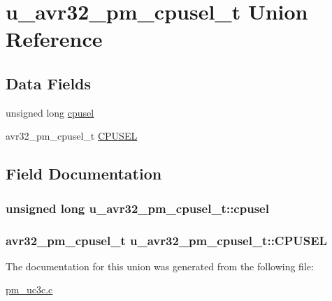 \hypertarget{unionu__avr32__pm__cpusel__t}{
\section{u\-\_\-avr32\-\_\-pm\-\_\-cpusel\-\_\-t \-Union \-Reference}
\label{unionu__avr32__pm__cpusel__t}
}
\subsection*{\-Data \-Fields}
\begin{DoxyCompactItemize}
\item 
unsigned long \hyperlink{unionu__avr32__pm__cpusel__t_ad91bec8f2c8bcc786fcbb710d5354154}{cpusel}
\item 
avr32\-\_\-pm\-\_\-cpusel\-\_\-t \hyperlink{unionu__avr32__pm__cpusel__t_a975b36252484e92630b1e999b83062bb}{\-C\-P\-U\-S\-E\-L}
\end{DoxyCompactItemize}


\subsection{\-Field \-Documentation}
\hypertarget{unionu__avr32__pm__cpusel__t_ad91bec8f2c8bcc786fcbb710d5354154}{
\subsubsection[{cpusel}]{\setlength{\rightskip}{0pt plus 5cm}unsigned long {\bf u\-\_\-avr32\-\_\-pm\-\_\-cpusel\-\_\-t\-::cpusel}}}
\label{unionu__avr32__pm__cpusel__t_ad91bec8f2c8bcc786fcbb710d5354154}
\hypertarget{unionu__avr32__pm__cpusel__t_a975b36252484e92630b1e999b83062bb}{
\subsubsection[{\-C\-P\-U\-S\-E\-L}]{\setlength{\rightskip}{0pt plus 5cm}avr32\-\_\-pm\-\_\-cpusel\-\_\-t {\bf u\-\_\-avr32\-\_\-pm\-\_\-cpusel\-\_\-t\-::\-C\-P\-U\-S\-E\-L}}}
\label{unionu__avr32__pm__cpusel__t_a975b36252484e92630b1e999b83062bb}


\-The documentation for this union was generated from the following file\-:\begin{DoxyCompactItemize}
\item 
\hyperlink{pm__uc3c_8c}{pm\-\_\-uc3c.\-c}\end{DoxyCompactItemize}
